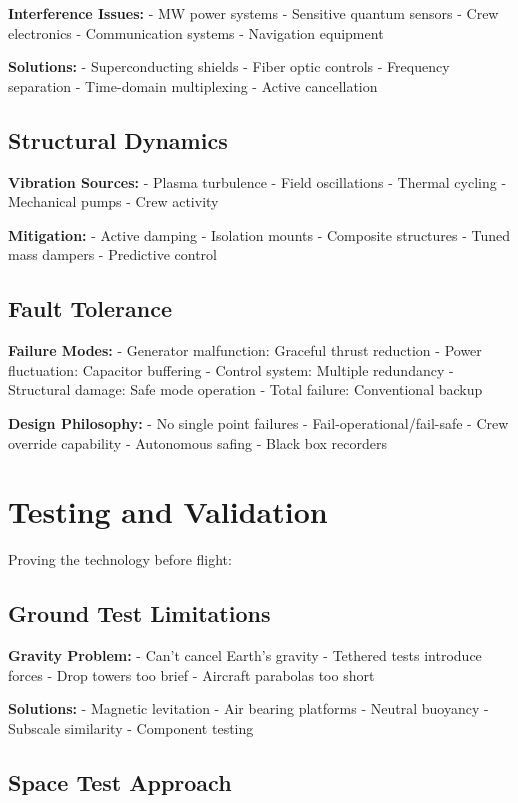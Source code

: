 \documentclass[12pt,letterpaper]{book}
\theoremstyle{definition}
\theoremstyle{plain}
\theoremstyle{remark}
\begin{document}
{{{{{\textbf{Interference Issues:}
- MW power systems
- Sensitive quantum sensors
- Crew electronics
- Communication systems
- Navigation equipment

\textbf{Solutions:}
- Superconducting shields
- Fiber optic controls
- Frequency separation
- Time-domain multiplexing
- Active cancellation

\subsection{Structural Dynamics}

\textbf{Vibration Sources:}
- Plasma turbulence
- Field oscillations
- Thermal cycling
- Mechanical pumps
- Crew activity

\textbf{Mitigation:}
- Active damping
- Isolation mounts
- Composite structures
- Tuned mass dampers
- Predictive control

\subsection{Fault Tolerance}

\textbf{Failure Modes:}
- Generator malfunction: Graceful thrust reduction
- Power fluctuation: Capacitor buffering
- Control system: Multiple redundancy
- Structural damage: Safe mode operation
- Total failure: Conventional backup

\textbf{Design Philosophy:}
- No single point failures
- Fail-operational/fail-safe
- Crew override capability
- Autonomous safing
- Black box recorders

\section{Testing and Validation}

Proving the technology before flight:

\subsection{Ground Test Limitations}

\textbf{Gravity Problem:}
- Can't cancel Earth's gravity
- Tethered tests introduce forces
- Drop towers too brief
- Aircraft parabolas too short

\textbf{Solutions:}
- Magnetic levitation
- Air bearing platforms
- Neutral buoyancy
- Subscale similarity
- Component testing

\subsection{Space Test Approach}

}}}}}
\end{document}
